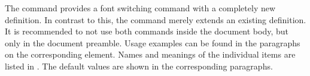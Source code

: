 The command  provides a font switching command with a
completely new definition. In contrast to this, the 
command merely extends an existing definition. It is recommended to not use
both commands inside the document body, but only in the document preamble.
Usage examples can be found in the paragraphs on the corresponding element.
\fi %
Names and meanings of the individual items are listed in %
%
%
.  %
%
The default values are shown in the corresponding paragraphs.

